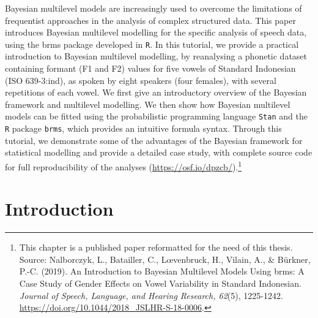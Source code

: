 \documentclass[a4paper,12pt,twoside,onecolumn,openright,final,oldfontcommands]{memoir}
\let\rmarkdownfootnote\footnote%
\def\footnote{\protect\rmarkdownfootnote}
\begin{document}
Bayesian multilevel models are increasingly used to overcome the limitations of frequentist approaches in the analysis of complex structured data. This paper introduces Bayesian multilevel modelling for the specific analysis of speech data, using the brms package developed in \texttt{R}. In this tutorial, we provide a practical introduction to Bayesian multilevel modelling, by reanalysing a phonetic dataset containing formant (F1 and F2) values for five vowels of Standard Indonesian (ISO 639-3:ind), as spoken by eight speakers (four females), with several repetitions of each vowel. We first give an introductory overview of the Bayesian framework and multilevel modelling. We then show how Bayesian multilevel models can be fitted using the probabilistic programming language \texttt{Stan} and the \texttt{R} package \texttt{brms}, which provides an intuitive formula syntax. Through this tutorial, we demonstrate some of the advantages of the Bayesian framework for statistical modelling and provide a detailed case study, with complete source code for full reproducibility of the analyses (\url{https://osf.io/dpzcb/}).\footnote{This chapter is a published paper reformatted for the need of this thesis. Source: Nalborczyk, L., Batailler, C., L\oe venbruck, H., Vilain, A., \& Bürkner, P.-C. (2019). An Introduction to Bayesian Multilevel Models Using brms: A Case Study of Gender Effects on Vowel Variability in Standard Indonesian. \emph{Journal of Speech, Language, and Hearing Research, 62}(5), 1225-1242. \url{https://doi.org/10.1044/2018_JSLHR-S-18-0006}.}

\hypertarget{introduction-5}{%
\section{Introduction}\label{introduction-5}}
\end{document}
